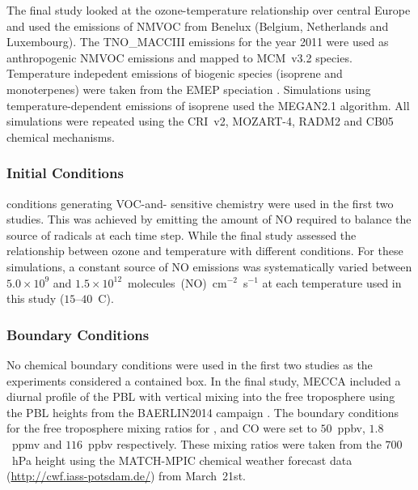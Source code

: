 The final study looked at the ozone-temperature relationship over central Europe and used the emissions of NMVOC from Benelux (Belgium, Netherlands and Luxembourg).
The TNO\_MACCIII emissions for the year 2011 were used as anthropogenic NMVOC emissions and mapped to MCM~v3.2 species.
Temperature indepedent emissions of biogenic species (isoprene and monoterpenes) were taken from the EMEP speciation \citep{Simpson:2012}.
Simulations using temperature-dependent emissions of isoprene used the MEGAN2.1 \citep{Guenther:2012} algorithm.
All simulations were repeated using the CRI~v2, MOZART-4, RADM2 and CB05 chemical mechanisms.

\subsubsection{ Initial Conditions} 
 conditions generating VOC-and- sensitive chemistry were used in the first two studies.
This was achieved by emitting the amount of NO required to balance the source of radicals at each time step.
While the final study assessed the relationship between ozone and temperature with different  conditions.
For these simulations, a constant source of NO emissions was systematically varied between $5.0 \times 10^9$ and $1.5 \times 10^{12}$~molecules~(NO)~cm$^{-2}$~s$^{-1}$ at each temperature used in this study ($15$--$40$~\degree C).

\subsubsection{Boundary Conditions} 
No chemical boundary conditions were used in the first two studies as the experiments considered a contained box.
In the final study, MECCA included a diurnal profile of the PBL with vertical mixing into the free troposphere using the PBL heights from the BAERLIN2014 campaign \citep{Bonn:2016}.
The boundary conditions for the free troposphere mixing ratios for ,  and CO were set to $50$~ppbv, $1.8$~ppmv and $116$~ppbv respectively. 
These mixing ratios were taken from the $700$~hPa height using the MATCH-MPIC chemical weather forecast data (\url{http://cwf.iass-potsdam.de/}) from March~21st.
